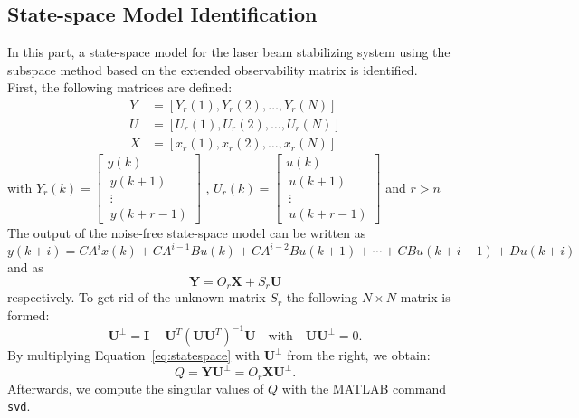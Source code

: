 \documentclass{scrartcl}
\begin{document}
\subsection{State-space Model Identification}
In this part, a state-space model for the laser beam stabilizing system using the subspace method based on the extended observability matrix is identified. \\
First, the following matrices are defined: 
\begin{align}
 Y &= \left[Y_r(1), Y_r(2),\ldots,Y_r(N) \right] \\
 U &= \left[U_r(1), U_r(2),\ldots,U_r(N) \right] \\
 X &= \left[x_r(1), x_r(2),\ldots,x_r(N) \right]
\end{align}
with 
\quad $Y_r(k) = \left[ \begin{array}{c} y(k) \\\ y(k+1) \\\ \vdots \\\ y(k + r -1) \end{array}\right] $ , \quad $U_r(k) = \left[ \begin{array}{c} u(k) \\\ u(k+1) \\\ \vdots \\\ u(k + r -1) \end{array}\right] $ \quad and \quad $r > n $\\
The output of the noise-free state-space model can be written as
\begin{equation}
y(k+i) = CA^{i}x(k) + CA^{i-1}Bu(k) + CA^{i-2}Bu(k+1) + \cdots + CBu(k+i-1) + Du(k+i)
\end{equation}
and as 
\begin{equation}
\textbf{Y} = O_r \textbf{X} + S_r \textbf{U}
\label{eq:statespace}
\end{equation}
respectively. 
To get rid of the unknown matrix $S_r$ the following $ N \times N $ matrix is formed: 
\begin{equation}
\textbf{U}^{\bot} = \textbf{I} - \textbf{U}^{T}(\textbf{U}\textbf{U}^{T})^{-1}\textbf{U} \quad \text{with} \quad \textbf{U}\textbf{U}^{\bot} = 0.
\end{equation}
By multiplying Equation~\ref{eq:statespace} with $\textbf{U}^{\bot}$ from the right, we obtain:
\begin{equation}
	Q = \textbf{Y}\textbf{U}^{\bot} = O_r\textbf{X}\textbf{U}^{\bot}.
\end{equation}
Afterwards, we compute the singular values of $Q$ with the MATLAB command \texttt{svd}. 
\end{document}
